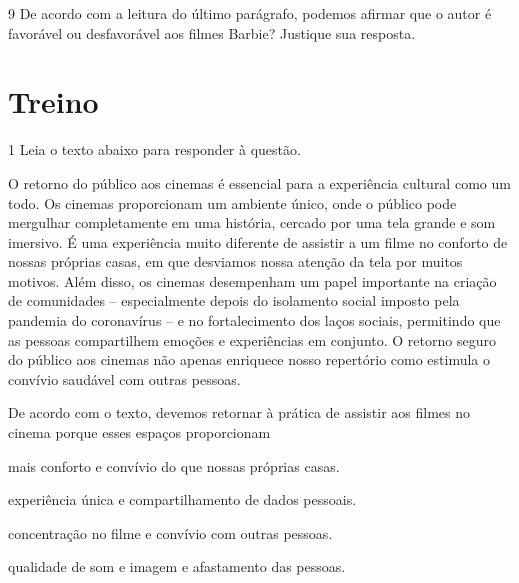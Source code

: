 \num{9} De acordo com a leitura do último parágrafo, podemos afirmar que o autor
é favorável ou desfavorável aos filmes Barbie? Justique sua resposta. 


\section*{Treino}

\num{1} Leia o texto abaixo para responder à questão.

\begin{myquote}

O retorno do público aos cinemas é essencial para a experiência cultural como
um todo. Os cinemas proporcionam um ambiente único, onde o público pode
mergulhar completamente em uma história, cercado por uma tela grande e som
imersivo. É uma experiência muito diferente de assistir a um filme 
no conforto de nossas próprias casas, em que desviamos nossa atenção da tela 
por muitos motivos. Além disso, os cinemas desempenham um papel importante 
na criação de comunidades -- especialmente depois do isolamento social imposto 
pela pandemia do coronavírus -- e no fortalecimento dos laços sociais, permitindo 
que as pessoas compartilhem emoções e experiências em conjunto. O retorno seguro 
do público aos cinemas não apenas enriquece nosso repertório como estimula o convívio
saudável com outras pessoas.


\end{myquote}

De acordo com o texto, devemos retornar à prática de assistir aos filmes 
no cinema porque esses espaços proporcionam

\begin{escolha}

  \item mais conforto e convívio do que nossas próprias casas.

  \item experiência única e compartilhamento de dados pessoais. 

  \item concentração no filme e convívio com outras pessoas.

  \item qualidade de som e imagem e afastamento das pessoas. 

\end{escolha}


